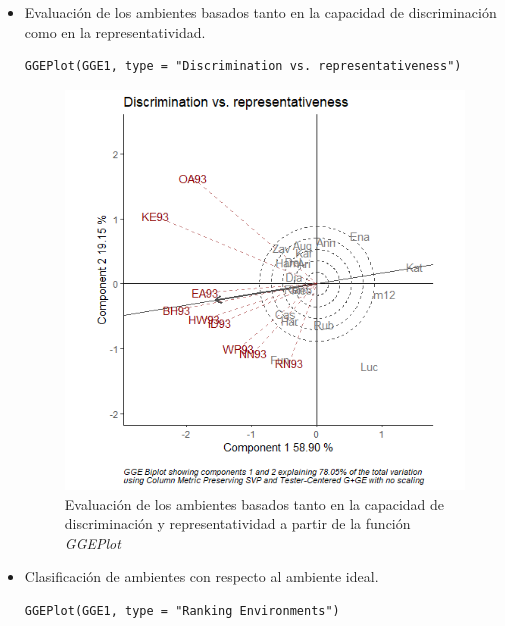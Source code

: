 \begin{itemize}
\item Evaluación de los ambientes basados tanto en la capacidad de discriminación como en la representatividad.

\begin{lstlisting}
GGEPlot(GGE1, type = "Discrimination vs. representativeness")
\end{lstlisting}

\begin{figure}[H]
	\begin{center}
		\includegraphics[width=12cm]{./Graficos/Discriminationvsrepresentativeness.png}
	\end{center}
	\caption{Evaluación de los ambientes basados tanto en la capacidad de discriminación y representatividad a partir de la función \emph{GGEPlot}}
\end{figure}



\item Clasificación de ambientes con respecto al ambiente ideal.

\begin{lstlisting}
GGEPlot(GGE1, type = "Ranking Environments")
\end{lstlisting}


\end{itemize}

